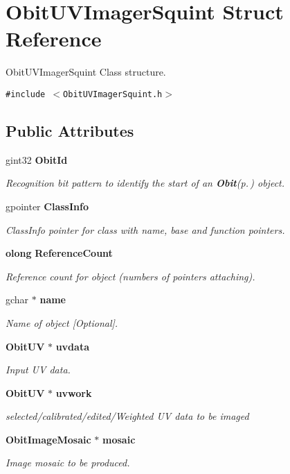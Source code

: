 \section{Obit\-UVImager\-Squint Struct Reference}
\label{structObitUVImagerSquint}
Obit\-UVImager\-Squint Class structure.  


{\tt \#include $<$Obit\-UVImager\-Squint.h$>$}

\subsection*{Public Attributes}
\begin{CompactItemize}
\item 
gint32 {\bf Obit\-Id}
\begin{CompactList}\small\item\em Recognition bit pattern to identify the start of an {\bf Obit}{\rm (p.\,\pageref{structObit})} object. \item\end{CompactList}\item 
gpointer {\bf Class\-Info}
\begin{CompactList}\small\item\em Class\-Info pointer for class with name, base and function pointers. \item\end{CompactList}\item 
{\bf olong} {\bf Reference\-Count}
\begin{CompactList}\small\item\em Reference count for object (numbers of pointers attaching). \item\end{CompactList}\item 
gchar $\ast$ {\bf name}
\begin{CompactList}\small\item\em Name of object [Optional]. \item\end{CompactList}\item 
{\bf Obit\-UV} $\ast$ {\bf uvdata}
\begin{CompactList}\small\item\em Input UV data. \item\end{CompactList}\item 
{\bf Obit\-UV} $\ast$ {\bf uvwork}
\begin{CompactList}\small\item\em selected/calibrated/edited/Weighted UV data to be imaged \item\end{CompactList}\item 
{\bf Obit\-Image\-Mosaic} $\ast$ {\bf mosaic}
\begin{CompactList}\small\item\em Image mosaic to be produced. \item\end{CompactList}\end{CompactItemize}


